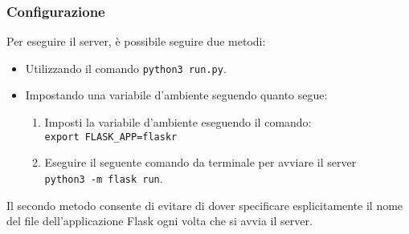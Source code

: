 \documentclass[a4paper,10pt]{article}
\begin{document}
\subsubsection*{Configurazione}
Per eseguire il server, è possibile seguire due metodi:

\begin{itemize}
  \item Utilizzando il comando \texttt{python3 run.py}.
  \item Impostando una variabile d'ambiente seguendo quanto segue:
  \begin{enumerate}
    \item Imposti la variabile d'ambiente eseguendo il comando:\\
    \texttt{export FLASK\_APP=flaskr}
    \item Eseguire il seguente comando da terminale per avviare il server \\
    \texttt{python3 -m flask run}.
  \end{enumerate}
\end{itemize}

Il secondo metodo consente di evitare di dover specificare esplicitamente il nome del file dell'applicazione Flask ogni volta che si avvia il server.
\end{document}
